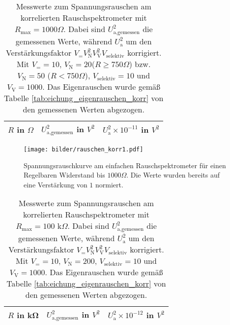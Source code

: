 		\begin{table}[h]
			\centering
			\begin{tabular}{ccc}
				\toprule \midrule
				$R$ in $\Omega$ & $U_\text{a,gemessen}^2$ in $V^2$
				& $U_\text{a}^2 \times 10^{-11}$ in $V^2$\\
				\midrule
				
				\midrule \bottomrule
			\end{tabular}
			\caption{Messwerte zum Spannungsrauschen am korrelierten
			Rauschspektrometer mit $R_\text{max}=1000 \Omega$. Dabei sind
			$U_\text{a,gemessen}^2$ die gemessenen Werte, während $U_\text{a}^2$ um den
			Verstärkungsfaktor $V_= V_\text{N}^2 V_\text{V}^2 V_\text{selektiv}$ korrigiert.
			Mit $V_= =10$, $V_\text{N}=20$($R\geq 750\Omega$) bzw. $V_\text{N}=50$
			($R<750\Omega$), $V_\text{selektiv}=10$ und $V_\text{V}=1000$.
			Das Eigenrauschen wurde gemäß Tabelle
			\ref{tab:eichung_eigenrauschen_korr} von den gemessenen Werten
			abgezogen.}
			\label{tab:rauschen_korr1}
	\end{table}

	\begin{figure}[h]
			\centering
			\texttt{[image: bilder/rauschen\_korr1.pdf]}
			\caption{Spannungsrauschkurve am einfachen Rauschspektrometer für einen
			Regelbaren Widerstand bis $1000\Omega$. Die Werte wurden bereits auf eine Verstärkung von
			$1$ normiert.}
			\label{fig:rauschen_korr1}
	\end{figure}



	\begin{table}[h]
			\centering
			\begin{tabular}{ccc}
				\toprule \midrule
				$R$ in \si{\kilo\ohm} & $U_\text{a,gemessen}^2$ in $V^2$
				&$U_\text{a}^2 \times 10^{-12}$ in $V^2$ \\
				\midrule
				
				\midrule \bottomrule
			\end{tabular}
			\caption{Messwerte zum Spannungsrauschen am korrelierten
			Rauschspektrometer mit $R_\text{max}=100 \text{ k}\Omega$. Dabei sind
			$U_\text{a,gemessen}^2$ die gemessenen Werte, während $U_\text{a}^2$ um den
			Verstärkungsfaktor $V_= V_\text{N}^2 V_\text{V}^2 V_\text{selektiv}$ korrigiert.
			Mit $V_= =10$, $V_\text{N}=200$, $V_\text{selektiv}=10$ und $V_\text{V}=1000$. Das Eigenrauschen wurde gemäß Tabelle
			\ref{tab:eichung_eigenrauschen_korr} von den gemessenen Werten
			abgezogen. }
			\label{tab:rauschen_korr2}
	\end{table}

